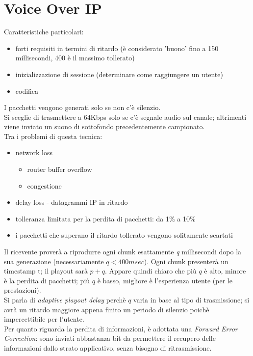 \section{Voice Over IP}
Caratteristiche particolari:
\begin{itemize}
    \item forti requisiti in termini di ritardo (è considerato 'buono' fino a 150 millisecondi, 400 è il massimo tollerato)
    \item inizializzazione di sessione (determinare come raggiungere un utente)
    \item codifica
\end{itemize}
I pacchetti vengono generati solo se non c'è silenzio.\\
Si sceglie di trasmettere a 64Kbps solo se c'è segnale audio sul canale; altrimenti viene inviato un suono di sottofondo precedentemente campionato.\\
Tra i problemi di questa tecnica:
\begin{itemize}
    \item network loss
    \begin{itemize}
        \item router buffer overflow
        \item congestione
    \end{itemize}
    \item delay loss - datagrammi IP in ritardo
    \item tolleranza limitata per la perdita di pacchetti: da 1\% a 10\%
    \item i pacchetti che superano il ritardo tollerato vengono solitamente scartati
\end{itemize}
Il ricevente proverà a riprodurre ogni chunk esattamente \textit{q} millisecondi dopo la sua generazione (necessariamente $ q < 400msec $). Ogni chunk presenterà un timestamp t; il playout sarà $ p+q $. Appare quindi chiaro che più $ q $ è alto, minore è la perdita di pacchetti; più $ q $ è basso, migliore è l'esperienza utente (per le prestazioni).\\
Si parla di \textit{adaptive playout delay} perchè $ q $ varia in base al tipo di trasmissione; si avrà un ritardo maggiore appena finito un periodo di silenzio poichè impercettibile per l'utente.\\
Per quanto riguarda la perdita di informazioni, è adottata una \textit{Forward Error Correction}: sono inviati abbastanza bit da permettere il recupero delle informazioni dallo strato applicativo, senza bisogno di ritrasmissione.\\
